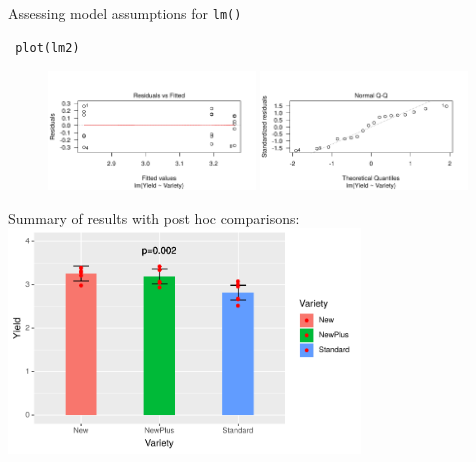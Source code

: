 \documentclass[10pt]{beamer}
\makeatletter
\newenvironment{kframe}{%
 \def\at@end@of@kframe{}%
 \ifinner\ifhmode%
  \def\at@end@of@kframe{\end{minipage}}%
  \begin{minipage}{\columnwidth}%
 \fi\fi%
 \def\FrameCommand##1{\hskip\@totalleftmargin \hskip-\fboxsep
 \colorbox{shadecolor}{##1}\hskip-\fboxsep
     \hskip-\linewidth \hskip-\@totalleftmargin \hskip\columnwidth}%
 \MakeFramed {\advance\hsize-\width
   \@totalleftmargin\z@ \linewidth\hsize
   \@setminipage}}%
 {\par\unskip\endMakeFramed%
 \at@end@of@kframe}
\newenvironment{knitrout}{}{} %
\makeatother
\begin{document}
\begin{frame}[fragile]{Assessing model assumptions for \texttt{lm()}}
     \begin{knitrout}
\color{fgcolor}\begin{kframe}
\footnotesize
\begin{verbatim}
 plot(lm2)
\end{verbatim}
\end{kframe}
\end{knitrout}
 
 \begin{figure}
  \includegraphics[width=0.49\textwidth]{Figures/assump1}
  \includegraphics[width=0.49\textwidth]{Figures/assump2}
 \end{figure}

\end{frame}


\begin{frame}{Summary of results with post hoc comparisons:}
\centering
\includegraphics[width=0.7\textwidth]{Figures/wheatres}
\end{frame}
\end{document}
